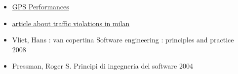 \begin{itemize}

\item \href{https://www.gps.gov/systems/gps/performance/accuracy/}{GPS Performances}

\item	\href{https://milano.corriere.it/notizie/cronaca/18_dicembre_12/milano-allarme-sosta-selvaggia-ogni-giorno-divieto-centomila-auto-solo-3percento-sanzioni-abe397ce-fe44-11e8-89a1-ceb28fd9db2c.shtml?refresh_ce-cp TODO when everything else is done}{article about traffic violations in milan}

\item Vliet, Hans : van copertina Software engineering : principles and practice 2008

\item 	Pressman, Roger S. Principi di ingegneria del software 2004



\end{itemize}